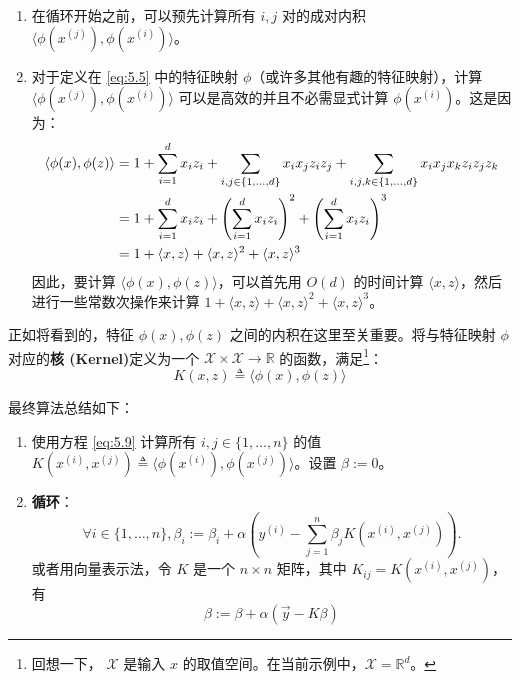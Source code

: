 \begin{enumerate}
    \item 在循环开始之前，可以预先计算所有 $i, j$ 对的成对内积 $\langle \phi(x^{(j)}), \phi(x^{(i)}) \rangle$。
    \item 对于定义在 \eqref{eq:5.5} 中的特征映射 $\phi$（或许多其他有趣的特征映射），计算 $\langle \phi(x^{(j)}), \phi(x^{(i)}) \rangle$ 可以是高效的并且不必需显式计算 $\phi(x^{(i)})$。这是因为：
    \begin{align} 
        \langle \phi(x), \phi(z) \rangle &= 1 + \sum_{i=1}^d x_i z_i + \sum_{i,j \in \{1, \dots, d\}} x_i x_j z_i z_j + \sum_{i,j,k \in \{1, \dots, d\}} x_i x_j x_k z_i z_j z_k \notag\\ 
        &= 1 + \sum_{i=1}^d x_i z_i + \left( \sum_{i=1}^d x_i z_i \right)^2 + \left( \sum_{i=1}^d x_i z_i \right)^3 \notag\\ 
        &= 1 + \langle x, z \rangle + \langle x, z \rangle^2 + \langle x, z \rangle^3 \label{eq:5.9}
    \end{align}
    因此，要计算 $\langle \phi(x), \phi(z) \rangle$，可以首先用 $O(d)$ 的时间计算 $\langle x, z \rangle$，然后进行一些常数次操作来计算 $1 + \langle x, z \rangle + \langle x, z \rangle^2 + \langle x, z \rangle^3$。
\end{enumerate}

正如将看到的，特征 $\phi(x), \phi(z)$ 之间的内积在这里至关重要。将与特征映射 $\phi$ 对应的\textbf{核 (Kernel)}定义为一个 $\mathcal{X} \times \mathcal{X} \to \mathbb{R}$ 的函数，满足\footnote{回想一下， $\mathcal{X}$ 是输入 $x$ 的取值空间。在当前示例中，$\mathcal{X} = \mathbb{R}^d$。}：
\begin{equation}
    K(x, z) \triangleq \langle \phi(x), \phi(z) \rangle
\end{equation}

最终算法总结如下：

\noindent\hrulefill
\begin{enumerate}
    \item 使用方程 \eqref{eq:5.9} 计算所有 $i, j \in \{1, \dots, n\}$ 的值 $K(x^{(i)}, x^{(j)}) \triangleq \langle \phi(x^{(i)}), \phi(x^{(j)}) \rangle$。设置 $\beta := 0$。
    \item \textbf{循环}：
    \begin{equation}
        \forall i \in \{1, \dots, n\}, \beta_i := \beta_i + \alpha \left( y^{(i)} - \sum_{j=1}^n \beta_j K(x^{(i)}, x^{(j)}) \right).
        \label{eq:kernel_algo}
    \end{equation}
    或者用向量表示法，令 $K$ 是一个 $n \times n$ 矩阵，其中 $K_{ij} = K(x^{(i)}, x^{(j)})$，有
    \[
        \beta := \beta + \alpha (\vec{y} - K \beta)
    \]
\end{enumerate}
\hrulefill

